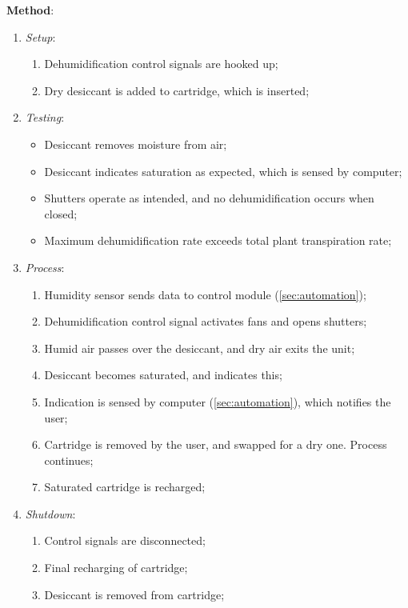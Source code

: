 \documentclass{../tex/report}
\begin{document}
\textbf{Method}:
\begin{enumerate}
    \item \textit{Setup}:
    \begin{enumerate}
        \item Dehumidification control signals are hooked up;
        \item Dry desiccant is added to cartridge, which is inserted;
    \end{enumerate}
    \item \textit{Testing}:
    \begin{itemize}
        \item Desiccant removes moisture from air;
        \item Desiccant indicates saturation as expected, which is sensed by computer;
        \item Shutters operate as intended, and no dehumidification occurs when closed;
        \item Maximum dehumidification rate exceeds total plant transpiration rate;
    \end{itemize}
    \item \textit{Process}:
    \begin{enumerate}
        \item Humidity sensor sends data to control module (\ref{sec:automation});
        \item Dehumidification control signal activates fans and opens shutters;
        \item Humid air passes over the desiccant, and dry air exits the unit;
        \item Desiccant becomes saturated, and indicates this;
        \item Indication is sensed by computer (\ref{sec:automation}), which notifies the user;
        \item Cartridge is removed by the user, and swapped for a dry one. Process continues;
        \item Saturated cartridge is recharged;
    \end{enumerate}
    \item \textit{Shutdown}:
    \begin{enumerate}
        \item Control signals are disconnected;
        \item Final recharging of cartridge;
        \item Desiccant is removed from cartridge;
    \end{enumerate}
\end{enumerate}
\end{document}

